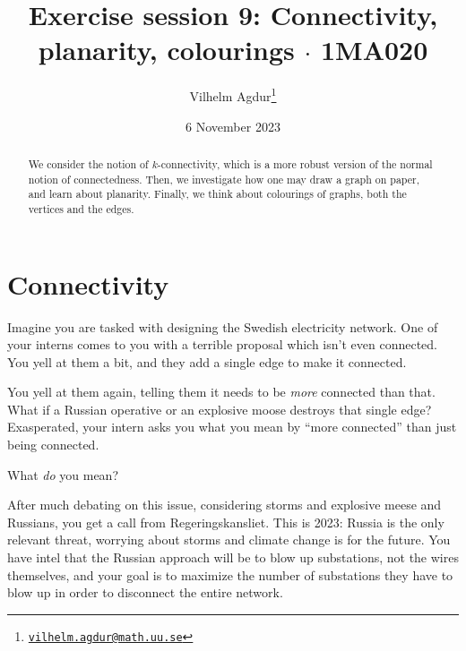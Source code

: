 \documentclass[nobib]{tufte-handout}
\title{Exercise session 9: Connectivity, planarity, colourings $\cdot$ 1MA020}
\author[Vilhelm Agdur]{Vilhelm Agdur\thanks{\href{mailto:vilhelm.agdur@math.uu.se}{\nolinkurl{vilhelm.agdur@math.uu.se}}}}
\date{6 November 2023}
\begin{document}
\maketitle%

\begin{abstract}
\noindent
We consider the notion of $k$-connectivity, which is a more robust version of the normal notion of connectedness. Then, we investigate how one may draw a graph on paper, and learn about planarity. Finally, we think about colourings of graphs, both the vertices and the edges.
\end{abstract}

\section{Connectivity}

Imagine you are tasked with designing the Swedish electricity network. One of your interns comes to you with a terrible proposal which isn't even connected. You yell at them a bit, and they add a single edge to make it connected.

You yell at them again, telling them it needs to be \emph{more} connected than that. What if a Russian operative or an explosive moose destroys that single edge? Exasperated, your intern asks you what you mean by ``more connected'' than just being connected.

\begin{xca}
  What \emph{do} you mean?
\end{xca}

After much debating on this issue, considering storms and explosive meese and Russians, you get a call from Regeringskansliet. This is 2023: Russia is the only relevant threat, worrying about storms and climate change is for the future. You have intel that the Russian approach will be to blow up substations, not the wires themselves, and your goal is to maximize the number of substations they have to blow up in order to disconnect the entire network.
\end{document}
